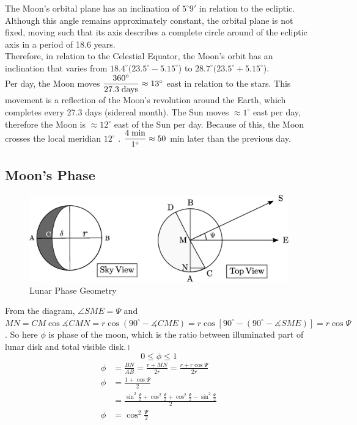\documentclass[a4paper,12pt]{extarticle}
\begin{document}
The Moon's orbital plane has an inclination of $5^\circ9'$ in relation to the ecliptic. Although this angle remains approximately constant, the orbital plane is not fixed, moving such that its axis describes a complete circle around of the ecliptic axis in a period of 18.6 years.\\

Therefore, in relation to the Celestial Equator, the Moon's orbit has an inclination that varies from $18.4^\circ(23.5^\circ - 5.15^\circ$) to $28.7^\circ(23.5^\circ + 5.15^\circ$).\\

Per day, the Moon moves $\dfrac{360^\circ}{27.3 \;\rm days} \approx 13^\circ$ east in relation to the stars. This movement is a reflection of the Moon's revolution around the Earth, which completes every 27.3 days (sidereal month). The Sun moves $\approx 1^\circ$ east per day, therefore the Moon is $\approx 12^\circ$ east of the Sun per day. Because of this, the Moon crosses the local meridian $12^\circ$ . $\dfrac{4 \;\rm min}{1^\circ} \approx 50$ min later than the previous day.

\subsection{Moon's Phase}

\begin{figure}[H]
	\centering
	\includegraphics[width=0.7\linewidth]{mphase1.eps}
	\caption{Lunar Phase Geometry}
\end{figure}
From the diagram, $\angle SME= \Psi$ and $MN= CM \cos \measuredangle CMN=r\cos (90^\circ- \measuredangle CME)=r\cos [90^\circ-(90^\circ-\measuredangle SME)]= r \cos \Psi$. So here $\phi$ is phase of the moon, which is the ratio between illuminated part of lunar disk and total visible disk.।
\[\boxed{0 \leq \phi \leq 1}\] 	
\begin{align}
	\phi &=\frac{BN}{AB}=\frac{r+MN}{2r}=\frac{r+r\cos\Psi}{2r} \nonumber \\
	\phi&= \frac{1+\cos\Psi}{2}\\
	&=\frac{\sin^2\frac{\Psi}{2}+\cos^2\frac{\Psi}{2}+ \cos^2\frac{\Psi}{2}-\sin^2\frac{\Psi}{2}}{2}\nonumber\\
	\phi&=\cos^2 \frac{\Psi}{2} \label{lunareqq}
\end{align}
\end{document}
